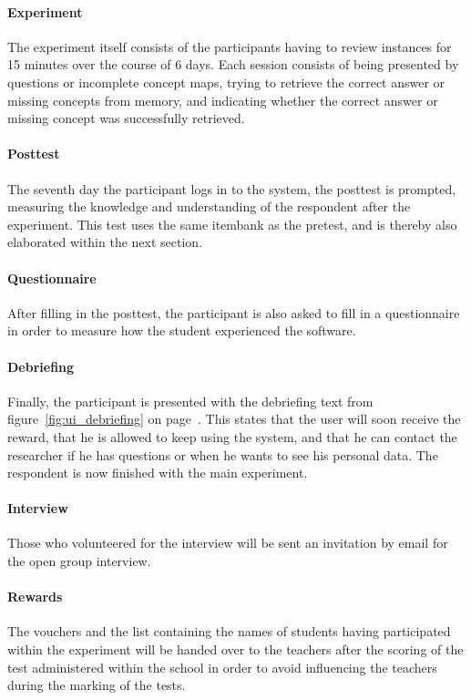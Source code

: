 \paragraph{Experiment} The experiment itself consists of the participants having to review instances for 15 minutes over the course of 6 days. Each session consists of being presented by questions or incomplete concept maps, trying to retrieve the correct answer or missing concepts from memory, and indicating whether the correct answer or missing concept was successfully retrieved.

\paragraph{Posttest} The seventh day the participant logs in to the system, the posttest is prompted, measuring the knowledge and understanding of the respondent after the experiment. This test uses the same itembank as the pretest, and is thereby also elaborated within the next section.

\paragraph{Questionnaire} After filling in the posttest, the participant is also asked to fill in a questionnaire in order to measure how the student experienced the software. 

\paragraph{Debriefing} Finally, the participant is presented with the debriefing text from figure~\ref{fig:ui_debriefing} on page~\pageref{fig:ui_debriefing}. This states that the user will soon receive the reward, that he is allowed to keep using the system, and that he can contact the researcher if he has questions or when he wants to see his personal data. The respondent is now finished with the main experiment.

\paragraph{Interview} Those who volunteered for the interview will be sent an invitation by email for the open group interview.

\paragraph{Rewards} The vouchers and the list containing the names of students having participated within the experiment will be handed over to the teachers after the scoring of the test administered within the school in order to avoid influencing the teachers during the marking of the tests.

